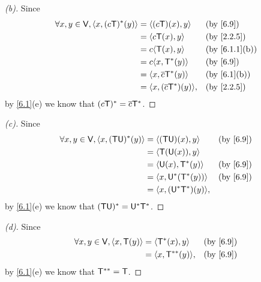\begin{proof}[(b)]
  Since
  \begin{align*}
    \forall x, y \in \V, \inn{x, (c \T)^*(y)} & = \inn{(c \T)(x), y}           &  & \text{(by \cref{6.9})}      \\
                                              & = \inn{c \T(x), y}             &  & \text{(by \cref{2.2.5})}    \\
                                              & = c \inn{\T(x), y}             &  & \text{(by \cref{6.1.1}(b))} \\
                                              & = c \inn{x, \T^*(y)}           &  & \text{(by \cref{6.9})}      \\
                                              & = \inn{x, \conj{c} \T^*(y)}    &  & \text{(by \cref{6.1}(b))}   \\
                                              & = \inn{x, (\conj{c} \T^*)(y)}, &  & \text{(by \cref{2.2.5})}
  \end{align*}
  by \cref{6.1}(e) we know that \((c \mathsf{T})^* = \overline{c} \mathsf{T}^*\).
\end{proof}

\begin{proof}[(c)]
  Since
  \begin{align*}
    \forall x, y \in \V, \inn{x, (\T \U)^*(y)} & = \inn{(\T \U)(x), y}      &  & \text{(by \cref{6.9})} \\
                                               & = \inn{\T(\U(x)), y}                                   \\
                                               & = \inn{\U(x), \T^*(y)}     &  & \text{(by \cref{6.9})} \\
                                               & = \inn{x, \U^*(\T^*(y))}   &  & \text{(by \cref{6.9})} \\
                                               & = \inn{x, (\U^* \T^*)(y)},
  \end{align*}
  by \cref{6.1}(e) we know that \((\mathsf{T} \mathsf{U})^* = \mathsf{U}^* \mathsf{T}^*\).
\end{proof}

\begin{proof}[(d)]
  Since
  \begin{align*}
    \forall x, y \in \V, \inn{x, \T(y)} & = \inn{\T^*(x), y}     &  & \text{(by \cref{6.9})} \\
                                        & = \inn{x, \T^{**}(y)}, &  & \text{(by \cref{6.9})}
  \end{align*}
  by \cref{6.1}(e) we know that \(\mathsf{T}^{**} = \mathsf{T}\).
\end{proof}

